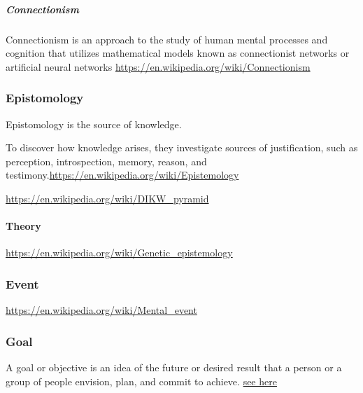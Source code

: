 \documentclass{book}
\newcommand{\seehere}[1]{\href{#1}{see here}}
\providecommand{\seehere}[1]{\href{#1}{see here}}
\begin{document}
\subparagraph{Connectionism}


Connectionism is an approach to the study of human mental processes and cognition that utilizes mathematical models known as connectionist networks or artificial neural networks \url{https://en.wikipedia.org/wiki/Connectionism}

\subsubsection{Epistomology}


Epistomology is the source of knowledge.
    
    To discover how knowledge arises, they investigate sources of justification, such as perception, introspection, memory, reason, and testimony.\url{https://en.wikipedia.org/wiki/Epistemology}


\url{https://en.wikipedia.org/wiki/DIKW_pyramid}

\paragraph{Theory}


\url{https://en.wikipedia.org/wiki/Genetic_epistemology}

\subsubsection{Event}


\url{https://en.wikipedia.org/wiki/Mental_event}

\subsubsection{Goal}


A goal or objective is an idea of the future or desired result that a person or a group of people envision, plan, and commit to achieve. \seehere{https://en.wikipedia.org/wiki/Goal}
    
\end{document}
